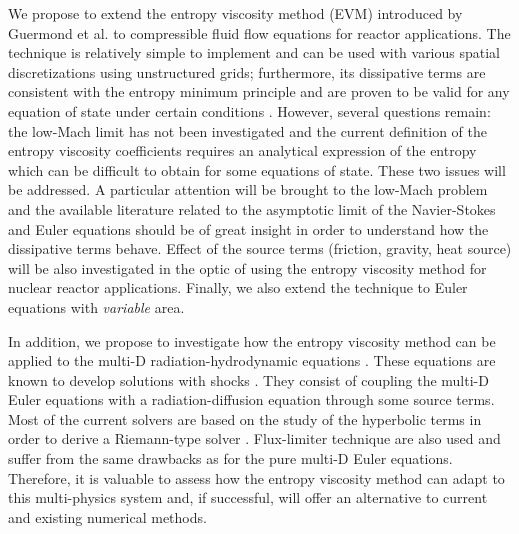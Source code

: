 We propose to extend the entropy viscosity method (EVM) introduced by Guermond et al. to compressible fluid flow equations for reactor applications. The technique is relatively simple to implement and can be used with various spatial discretizations using unstructured grids; furthermore, its dissipative terms are consistent with the entropy minimum principle and are proven to be valid for any equation of state under certain conditions \cite{jlg}. However, several questions remain: the low-Mach limit has not been investigated and the current definition of the entropy viscosity coefficients requires an analytical expression of the entropy which can be difficult to obtain for some equations of state. These two issues will be addressed. A particular attention will be brought to the low-Mach problem and the available literature related to the asymptotic limit of the Navier-Stokes \cite{Muller} and Euler equations \cite{LowMach1, LowMach2} should be of great insight in order to understand how the dissipative terms behave. Effect of the source terms (friction, gravity, heat source) will be also investigated in the optic of using the entropy viscosity method for nuclear reactor applications. Finally, we also extend the technique to Euler equations with \emph{variable} area.


In addition, we propose to investigate how the entropy viscosity method can be applied to the multi-D radiation-hydrodynamic equations \cite{LowrieMorelHittinger}. These equations are known to develop solutions with shocks \cite{Balsara}. They consist of coupling the multi-D Euler equations with a radiation-diffusion equation through some source terms.  Most of the current solvers are based on the study of the hyperbolic terms in order to derive a Riemann-type solver \cite{LowrieMorel}. Flux-limiter technique \cite{EdwardsMorelLowrie} are also used and suffer from the same drawbacks as for the pure multi-D Euler equations. Therefore, it is valuable to assess how the entropy viscosity method can adapt to this multi-physics system and, if successful, will offer an alternative to  current and existing numerical methods.\\

